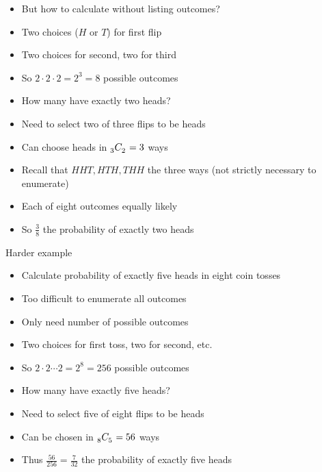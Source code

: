 \documentclass[handout,xcolor=dvipsnames]{beamer}
\theoremstyle{definition}
\newcommand\ncr[2]{\tensor[_{#1}]C{_{#2}}}
\begin{document}
\begin{frame}
\begin{itemize}
\item But how to calculate without listing outcomes?
\item Two choices ($H$ or $T$) for first flip
\item Two choices for second, two for third
\item So $2\cdot 2\cdot 2=2^3=8$ possible outcomes
\item How many have exactly two heads?
\item Need to select two of three flips to be heads
\item Can choose heads in $\ncr{3}{2}=3$ ways
\item Recall that $HHT,HTH,THH$ the three ways
(not strictly necessary to enumerate)
\item Each of eight outcomes equally likely
\item So $\frac{3}{8}$ the probability of exactly two heads
\end{itemize}
\end{frame}

\begin{frame}{Harder example}
\begin{itemize}
\item Calculate probability of exactly five heads in eight coin tosses
\item Too difficult to enumerate all outcomes
\item Only need \alert{number} of possible outcomes
\item Two choices for first toss, two for second, etc.
\item So $2\cdot 2\cdots 2=2^8=256$ possible outcomes
\item How many have exactly five heads?
\item Need to select five of eight flips to be heads
\item Can be chosen in $\ncr{8}{5}=56$ ways
\item Thus $\frac{56}{256}=\frac{7}{32}$ the probability
of exactly five heads
\end{itemize}
\end{frame}
\end{document}
